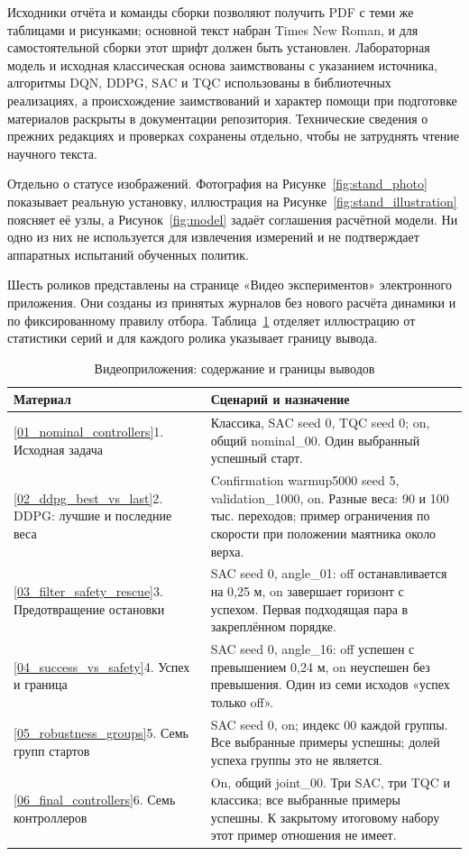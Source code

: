 Исходники отчёта и команды сборки позволяют получить PDF с теми же таблицами и рисунками; основной текст набран Times New Roman, и для самостоятельной сборки этот шрифт должен быть установлен. Лабораторная модель и исходная классическая основа заимствованы с указанием источника, алгоритмы DQN, DDPG, SAC и TQC использованы в библиотечных реализациях, а происхождение заимствований и характер помощи при подготовке материалов раскрыты в документации репозитория. Технические сведения о прежних редакциях и проверках сохранены отдельно, чтобы не затруднять чтение научного текста.

Отдельно о статусе изображений. Фотография на Рисунке~\ref{fig:stand_photo} показывает реальную установку, иллюстрация на Рисунке~\ref{fig:stand_illustration} поясняет её узлы, а Рисунок~\ref{fig:model} задаёт соглашения расчётной модели. Ни одно из них не используется для извлечения измерений и не подтверждает аппаратных испытаний обученных политик.

\label{app:videos}
Шесть роликов представлены на странице «Видео экспериментов» электронного приложения. Они созданы из принятых журналов без нового расчёта динамики и по фиксированному правилу отбора. Таблица~\ref{tab:videos} отделяет иллюстрацию от статистики серий и для каждого ролика указывает границу вывода.
\begin{table}[htbp]\caption{Видеоприложения: содержание и границы выводов}\label{tab:videos}
\begin{smalltable}\begin{tabularx}{\linewidth}{@{}p{36mm}X@{}}\toprule
Материал & Сценарий и назначение\\\midrule
\vref{01_nominal_controllers}{1. Исходная задача} & Классика, SAC seed 0, TQC seed 0; on, общий nominal\_00. Один выбранный успешный старт.\\
\vref{02_ddpg_best_vs_last}{2. DDPG: лучшие и последние веса} & Confirmation warmup5000 seed 5, validation\_1000, on. Разные веса: 90 и 100 тыс. переходов; пример ограничения по скорости при положении маятника около верха.\\
\vref{03_filter_safety_rescue}{3. Предотвращение остановки} & SAC seed 0, angle\_01: off останавливается на 0,25 м, on завершает горизонт с успехом. Первая подходящая пара в закреплённом порядке.\\
\vref{04_success_vs_safety}{4. Успех и граница} & SAC seed 0, angle\_16: off успешен с превышением 0,24 м, on неуспешен без превышения. Один из семи исходов «успех только off».\\
\vref{05_robustness_groups}{5. Семь групп стартов} & SAC seed 0, on; индекс 00 каждой группы. Все выбранные примеры успешны; долей успеха группы это не является.\\
\vref{06_final_controllers}{6. Семь контроллеров} & On, общий joint\_00. Три SAC, три TQC и классика; все выбранные примеры успешны. К закрытому итоговому набору этот пример отношения не имеет.\\\bottomrule
\end{tabularx}\end{smalltable}\end{table}

